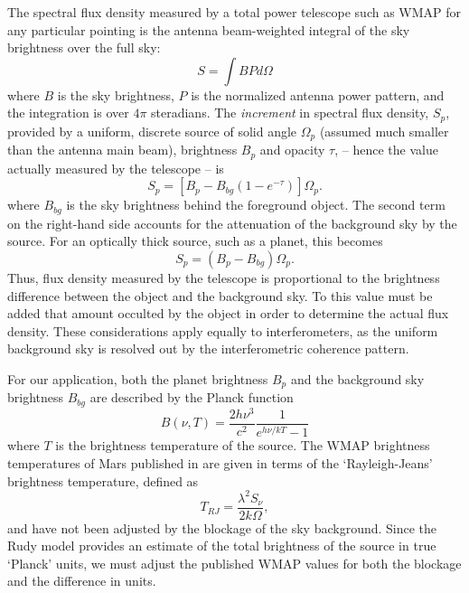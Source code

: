 \documentclass{aastex}
\begin{document}
The spectral flux density measured by a total power telescope such as
WMAP for any particular pointing is the antenna beam-weighted integral
of the sky brightness over the full sky:
\begin{equation}
S = \int BPd\Omega
\end{equation}
where $B$ is the sky brightness, $P$ is the normalized antenna power
pattern, and the integration is over $4\pi$ steradians.  The {\sl
increment} in spectral flux density, $S_p$, provided by a uniform, discrete
source of solid angle $\Omega_p$ (assumed much smaller than the
antenna main beam), brightness $B_p$ and opacity $\tau$, -- hence the
value actually measured by the telescope -- is
\begin{equation}
S_p = [B_p-B_{bg}(1-e^{-\tau})]\Omega_p.
\end{equation}
where $B_{bg}$ is the sky brightness behind the foreground object.  The
second term on the right-hand side accounts for the attenuation of the
background sky by the source.  For an optically thick source, such as a
planet, this becomes
\begin{equation}
S_p = (B_p - B_{bg})\Omega_p.
\end{equation}
Thus, flux density measured by the telescope is proportional to the
brightness difference between the object and the background sky. To
this value must be added that amount occulted by the object in order
to determine the actual flux density.  These considerations apply
equally to interferometers, as the uniform background sky is resolved
out by the interferometric coherence pattern.

For our application, both the planet brightness $B_p$ and the
background sky brightness $B_{bg}$ are described by the Planck
function
\begin{equation}
B(\nu,T) = \frac{2h\nu^3}{c^2}\frac{1}{e^{h\nu/kT}-1}
\end{equation}
where $T$ is the brightness temperature of the source.  The WMAP
brightness temperatures of Mars published in \citet{Wei11} are given in terms
of the `Rayleigh-Jeans' brightness temperature, defined as
\begin{equation}
T_{RJ} = \frac{\lambda^2 S_\nu}{2k\Omega},
\end{equation}
and have not been adjusted by the blockage of the sky background.
Since the Rudy model provides an estimate of the total brightness of
the source in true `Planck' units, we must adjust the published WMAP
values for both the blockage and the difference in units.
\end{document}
